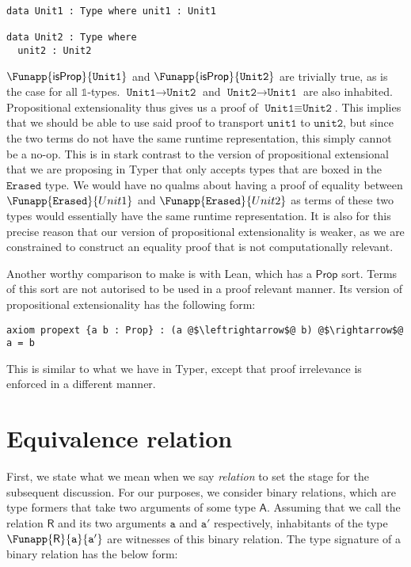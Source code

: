 \documentclass[12pt,twoside,maitrise]{dms}
\theoremstyle{definition}
\numberwithin{equation}{section}
\numberwithin{table}{chapter}
\numberwithin{figure}{chapter}
\newcommand\kw[1] {\textsf{#1}}
\newcommand\id[1] {\texttt{#1}}
\begin{document}
\begin{verbatim}
data Unit1 : Type where unit1 : Unit1

data Unit2 : Type where
  unit2 : Unit2
\end{verbatim}

$\Funapp{\kw{isProp}}{\id{Unit1}}$ and $\Funapp{\kw{isProp}}{\id{Unit2}}$ are
trivially true, as is the case for all $\mathbb{1}$-types. $\id{Unit1}
\rightarrow \id{Unit2}$ and $\id{Unit2} \rightarrow \id{Unit1}$ are also
inhabited. Propositional extensionality thus gives us a proof of $\id{Unit1}
\equiv \id{Unit2}$. This implies that we should be able to use said proof to
transport $\id{unit1}$ to $\id{unit2}$, but since the two terms do not have the
same runtime representation, this simply cannot be a no-op. This is in stark
contrast to the version of propositional extensional that we are proposing in
Typer that only accepts types that are boxed in the $\id{Erased}$ type. We would
have no qualms about having a proof of equality between
$\Funapp{\id{Erased}}{Unit1}$ and $\Funapp{\id{Erased}}{Unit2}$ as terms of
these two types would essentially have the same runtime representation. It is
also for this precise reason that our version of propositional extensionality is
weaker, as we are constrained to construct an equality proof that is not
computationally relevant.

Another worthy comparison to make is with Lean, which has a $\kw{Prop}$ sort.
Terms of this sort are not autorised to be used in a proof relevant manner. Its
version of propositional extensionality has the following form:

\begin{verbatim}
axiom propext {a b : Prop} : (a @$\leftrightarrow$@ b) @$\rightarrow$@ a = b
\end{verbatim}

This is similar to what we have in Typer, except that proof irrelevance is
enforced in a different manner.

\section{Equivalence relation}

First, we state what we mean when we say \emph{relation} to set the stage for
the subsequent discussion. For our purposes, we consider binary relations, which
are type formers that take two arguments of some type $\kw{A}$. Assuming that we
call the relation $\kw{R}$ and its two arguments $\id{a}$ and $\id{a}'$
respectively, inhabitants of the type $\Funapp{\kw{R}}{\id{a}}{\id{a}'}$ are
witnesses of this binary relation. The type signature of a binary relation has
the below form:
\end{document}
